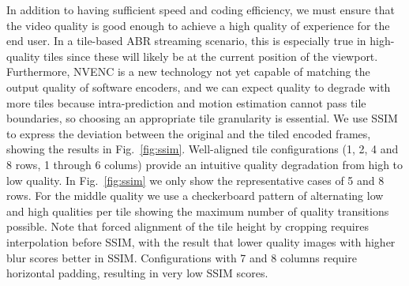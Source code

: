 In addition to having sufficient speed and coding efficiency, we must ensure that the video quality is good enough to achieve a high quality of experience for the end user.
In a tile-based ABR streaming scenario, this is especially true in high-quality tiles since these will likely be at the current position of the viewport.
Furthermore, NVENC is a new technology not yet capable of matching the output quality of software encoders, and we can expect quality to degrade with more tiles because intra-prediction and motion estimation cannot pass tile boundaries, so choosing an appropriate tile granularity is essential.
We use SSIM to express the deviation between the original and the tiled encoded frames, showing the results in Fig.~\ref{fig:ssim}.
Well-aligned tile configurations (1, 2, 4 and 8 rows, 1 through 6 colums) provide an intuitive quality degradation from high to low quality. In Fig.~\ref{fig:ssim} we only show the representative cases of 5 and 8 rows. For the middle quality we use a checkerboard pattern of alternating low and high qualities per tile showing the maximum number of quality transitions possible. Note that forced alignment of the tile height by cropping requires interpolation before SSIM, with the result that lower quality images with higher blur scores better in SSIM. Configurations with 7 and 8 columns require horizontal padding, resulting in very low SSIM scores.



